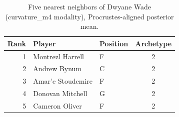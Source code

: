 \begin{table}[htbp]
  \centering\small
  \begin{tabular}{rllc}
    \toprule
    Rank & Player & Position & Archetype \\
    \midrule
    1 & Montrezl Harrell & F & 2 \\
    2 & Andrew Bynum & C & 2 \\
    3 & Amar'e Stoudemire & F & 2 \\
    4 & Donovan Mitchell & G & 2 \\
    5 & Cameron Oliver & F & 2 \\
    \bottomrule
  \end{tabular}
  \caption{Five nearest neighbors of Dwyane Wade (curvature_m4 modality), Procrustes-aligned posterior mean.}
  \label{tab:Dwyane_Wade_neighbors_curvature_m4}
\end{table}


